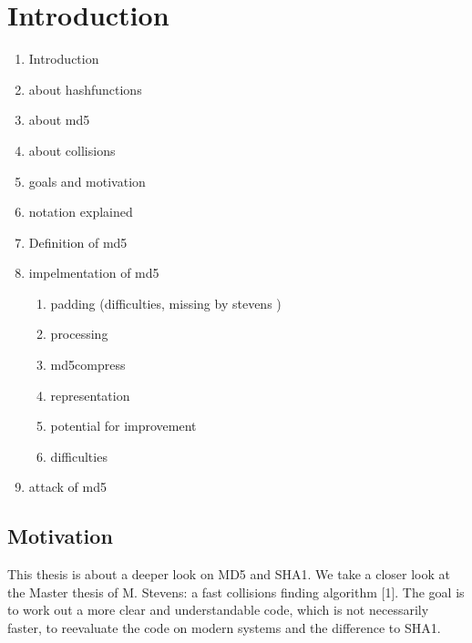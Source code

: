 \chapter{Introduction}
\begin{enumerate}

 
    \item Introduction
    \item about hashfunctions
    \item about md5
    \item about collisions
    \item goals and motivation
    \item notation explained
    \item Definition of md5
    \item impelmentation of md5
        \begin{enumerate}
            \item padding (difficulties, missing by stevens )
            \item processing
            \item md5compress
            \item representation
            \item potential for improvement 
            \item difficulties
        \end{enumerate}
    \item attack of md5
\end{enumerate}
\section*{Motivation}
This thesis is about a deeper look on MD5 and SHA1.
We take a closer look at the Master thesis of M. Stevens: a fast collisions finding algorithm [1].
The goal is to work out a more clear and understandable code, which is not necessarily faster, to reevaluate the code on modern systems and the difference to SHA1. 


